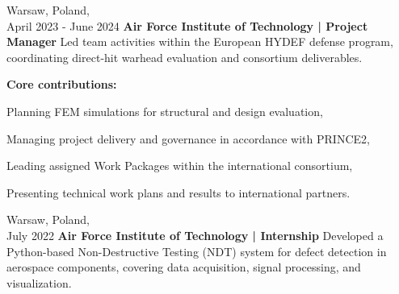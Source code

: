     \begin{twocolentry}{
        Warsaw, Poland, \\ April 2023 - June 2024
    }
        \textbf{Air Force Institute of Technology | Project Manager}\newline
        Led team activities within the European HYDEF defense program, coordinating direct-hit warhead evaluation and consortium deliverables. \\

        \vspace{0.1 cm}

        \textbf{Core contributions:}
        \begin{highlights}
            \item Planning FEM simulations for structural and design evaluation,
            \item Managing project delivery and governance in accordance with PRINCE2,
            \item Leading assigned Work Packages within the international consortium,
            \item Presenting technical work plans and results to international partners.
        \end{highlights}
    \end{twocolentry}

    \vspace{0.4 cm}

    \begin{twocolentry}{
        Warsaw, Poland, \\ July 2022
    }
        \textbf{Air Force Institute of Technology | Internship}\newline
        Developed a Python-based Non-Destructive Testing (NDT) system for defect detection in aerospace components, covering data acquisition, signal processing, and visualization.
    \end{twocolentry}
